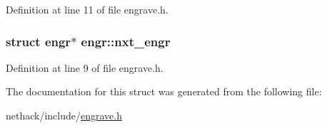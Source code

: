 Definition at line 11 of file engrave.\+h.

\hypertarget{structengr_a95826e1e303870061e04cc8a81d34662}{
\subsubsection[{nxt\+\_\+engr}]{\setlength{\rightskip}{0pt plus 5cm}struct {\bf engr}$\ast$ engr\+::nxt\+\_\+engr}}\label{structengr_a95826e1e303870061e04cc8a81d34662}


Definition at line 9 of file engrave.\+h.



The documentation for this struct was generated from the following file\+:\begin{DoxyCompactItemize}
\item 
nethack/include/\hyperlink{engrave_8h}{engrave.\+h}\end{DoxyCompactItemize}
